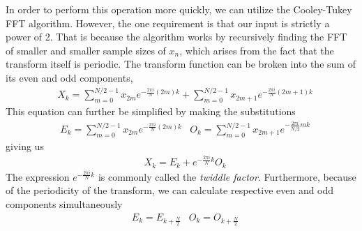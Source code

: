 \documentclass[12pt]{article}
\begin{document}
    In order to perform this operation more quickly, we can utilize the Cooley-Tukey FFT algorithm.
    However, the one requirement is that our input is strictly a power of 2.
    That is because the algorithm works by recursively finding the FFT of smaller and smaller sample sizes of $x_n$, which arises from the fact that the transform itself is periodic.
    The transform function can be broken into the sum of its even and odd components,
    \begin{align*} 
        &X_k = \sum \limits_{m=0}^{N/2-1} x_{2m}e^{-\frac{2\pi i}{N} (2m)k} + \sum \limits_{m=0}^{N/2-1} x_{2m+1} e^{-\frac{2\pi i}{N} (2m+1)k}
    \end{align*}
    This equation can further be simplified by making the substitutions
    \begin{align*}
        &E_k = \sum \limits_{m=0}^{N/2-1} x_{2m}e^{-\frac{2\pi i}{N} (2m)k}
        &O_k = \sum \limits_{m=0}^{N/2-1} x_{2m+1} e^{-\frac{2\pi i}{N/2} mk}
    \end{align*}
    giving us
    \begin{align*}
        &X_k = E_k + e^{-\frac{2\pi i}{N} k} O_k
    \end{align*}
    The expression $e^{-\frac{2\pi i}{N}k}$ is commonly called the \textit{twiddle factor}.
    Furthermore, because of the periodicity of the transform, we can calculate respective even and odd components simultaneously
    \begin{align*}
        &E_k = E_{k+\frac{N}{2}}
        &O_k = O_{k+\frac{N}{2}}
    \end{align*}
    
\end{document}
